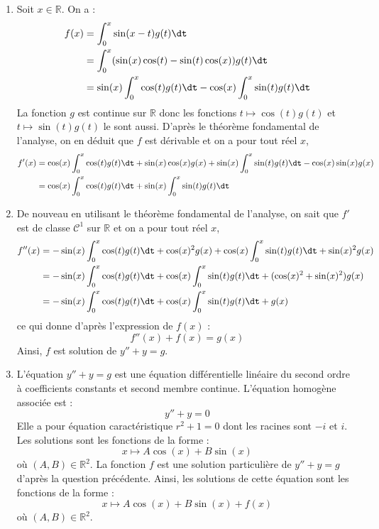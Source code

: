 \documentclass[a4paper,10pt]{report}
\begin{document}
\corr \begin{enumerate}
\item Soit $x \in \mathbb{R}$. On a :
\begin{align*}
f(x) &= \int_0^x \sin(x - t)g(t) \dt \\
& = \int_0^x (\sin(x)\cos(t)-\sin(t)\cos(x))g(t) \dt \\
& = \sin(x) \int_0^x \cos(t)g(t) \dt  -\cos(x) \int_0^x \sin(t)g(t) \dt \\
\end{align*}
La fonction $g$ est continue sur $\mathbb{R}$ donc les fonctions $t \mapsto \cos(t)g(t)$ et $t \mapsto \sin(t)g(t)$ le sont aussi. D'après le théorème fondamental de l'analyse, on en déduit que $f$ est dérivable et on a pour tout réel $x$,
\begin{align*}
f'(x) & = \cos(x) \int_0^x \cos(t)g(t) \dt + \sin(x)\cos(x) g(x) + \sin(x) \int_0^x \sin(t)g(t) \dt - \cos(x) \sin(x)g(x) \\
& = \cos(x) \int_0^x \cos(t)g(t) \dt  + \sin(x) \int_0^x \sin(t)g(t) \dt 
\end{align*}
\item De nouveau en utilisant le théorème fondamental de l'analyse, on sait que $f'$ est de classe $\mathcal{C}^1$ sur $\mathbb{R}$ et on a pour tout réel $x$,
\begin{align*}
f''(x) & = - \sin(x)\int_0^x \cos(t)g(t) \dt + \cos(x)^2 g(x) + \cos(x)  \int_0^x \sin(t)g(t) \dt  + \sin(x)^2 g(x) \\
& =  - \sin(x)\int_0^x \cos(t)g(t) \dt  + \cos(x)  \int_0^x \sin(t)g(t) \dt  + (\cos(x)^2+\sin(x)^2) g(x) \\
& =  - \sin(x)\int_0^x \cos(t)g(t) \dt  + \cos(x)  \int_0^x \sin(t)g(t) \dt + g(x) 
\end{align*}
ce qui donne d'après l'expression de $f(x)$ :
$$ f''(x)+f(x) = g(x)$$
Ainsi, $f$ est solution de $y''+y=g$.
\item L'équation $y''+y=g$ est une équation différentielle linéaire du second ordre à coefficients constants et second membre continue. L'équation homogène associée est :
$$ y''+y=0$$
Elle a pour équation caractéristique $r^2+1=0$ dont les racines sont $-i$ et $i$. Les solutions sont les fonctions de la forme :
$$ x \mapsto A \cos(x) + B \sin(x)$$
où $(A,B) \in \mathbb{R}^2$. La fonction $f$ est une solution particulière de $y''+y=g$ d'après la question précédente. Ainsi, les solutions de cette équation sont les fonctions de la forme :
$$ x \mapsto A \cos(x) + B \sin(x) + f(x)$$
où $(A,B) \in \mathbb{R}^2$.
\end{enumerate}
\end{document}
